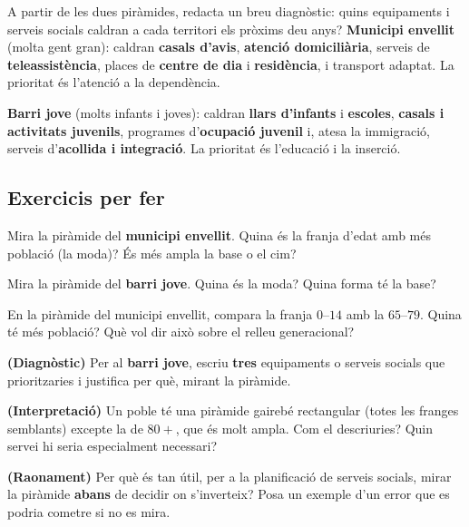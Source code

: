 \begin{exresolt}
A partir de les dues piràmides, redacta un breu diagnòstic: quins equipaments i
serveis socials caldran a cada territori els pròxims deu anys?
\solucio
\textbf{Municipi envellit} (molta gent gran): caldran \textbf{casals d'avis},
\textbf{atenció domiciliària}, serveis de \textbf{teleassistència}, places de
\textbf{centre de dia} i \textbf{residència}, i transport adaptat. La prioritat és
l'atenció a la dependència.

\textbf{Barri jove} (molts infants i joves): caldran \textbf{llars d'infants} i
\textbf{escoles}, \textbf{casals i activitats juvenils}, programes d'\textbf{ocupació
juvenil} i, atesa la immigració, serveis d'\textbf{acollida i integració}. La
prioritat és l'educació i la inserció.
\end{exresolt}

\subsection{Exercicis per fer}

\begin{exercicis}
\begin{exlist}
  \item Mira la piràmide del \textbf{municipi envellit}. Quina és la franja d'edat amb
        més població (la moda)? És més ampla la base o el cim?
  \item Mira la piràmide del \textbf{barri jove}. Quina és la moda? Quina forma té la
        base?
  \item En la piràmide del municipi envellit, compara la franja $0$–$14$ amb la
        $65$–$79$. Quina té més població? Què vol dir això sobre el relleu
        generacional?
  \item \textbf{(Diagnòstic)} Per al \textbf{barri jove}, escriu \textbf{tres}
        equipaments o serveis socials que prioritzaries i justifica per què, mirant la
        piràmide.
  \item \textbf{(Interpretació)} Un poble té una piràmide gairebé rectangular (totes
        les franges semblants) excepte la de $80+$, que és molt ampla. Com el
        descriuries? Quin servei hi seria especialment necessari?
  \item \textbf{(Raonament)} Per què és tan útil, per a la planificació de serveis
        socials, mirar la piràmide \textbf{abans} de decidir on s'inverteix? Posa un
        exemple d'un error que es podria cometre si no es mira.
\end{exlist}
\end{exercicis}

